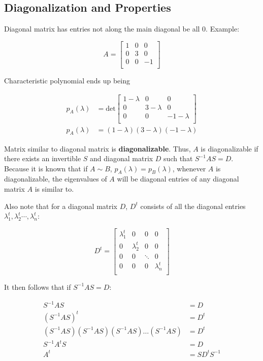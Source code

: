 \subsection{Diagonalization and Properties}

Diagonal matrix has entries not along the main diagonal be all 0. Example:

\[A=\begin{bmatrix}1&0&0\\0&3&0\\0&0&-1\\ \end{bmatrix}\]

Characteristic polynomial ends up being

\begin{align*}
    p_A(\lambda)&=\mbox{det}\begin{bmatrix}1-\lambda&0&0\\ 0&3-\lambda&0\\ 0&0&-1-\lambda\\ \end{bmatrix}\\
    p_A(\lambda)&=(1-\lambda)(3-\lambda)(-1-\lambda)
\end{align*}

\noindent
Matrix similar to diagonal matrix is \textbf{diagonalizable}. Thus, $A$ is diagonalizable if
there exists an invertible $S$ and diagonal matrix $D$ such that $\boxed{S^{-1}AS=D}$. 
Because it is known that if $A\sim B$, $p_A(\lambda)=p_B(\lambda)$, whenever $A$ is diagonalizable, the
eigenvalues of $A$ will be diagonal entries of any diagonal matrix $A$ is similar to.

\noindent
Also note that for a diagonal matrix $D$, $D^t$ consists of all the diagonal entries $\lambda_1^t, \lambda_2^t\cdots, \lambda_n^t$:

\[D^t=\begin{bmatrix}
    \lambda_1^t&0&0&0\\
    0&\lambda_2^t&0&0\\
    0&0&\ddots&0\\
    0&0&0&\lambda_n^t\\
\end{bmatrix}\]

It then follows that if $S^{-1}AS=D$:

\begin{align*}
    S^{-1}AS&=D\\
    (S^{-1}AS)^t&=D^t\\
    (S^{-1}AS)(S^{-1}AS)(S^{-1}AS)\dots(S^{-1}AS)&=D^t\\
    S^{-1}A^tS&=D\\
    A^t&=SD^tS^{-1}\\
\end{align*}

